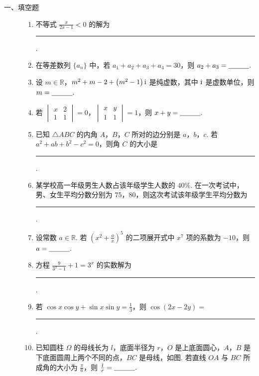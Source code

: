 \begin{description}

    \item[一、填空题]

    \begin{enumerate}[leftmargin=5pt]

        \item 不等式 \(\frac{x}{2x - 1} < 0\) 的解为\rule[-0.3ex]{3em}{0.4pt}.

        \item 在等差数列 \(\{a_n\}\) 中，若 \(a_1 + a_2 + a_3 + a_4 = 30\)，则 \(a_2 + a_3 =\rule[-0.3ex]{3em}{0.4pt}.\)

        \item 设 \(m \in \mathbb{R}\)，\(m^2 + m - 2 + \left(m^2 - 1\right)\mathrm{i}\) 是纯虚数，其中 \(\mathrm{i}\) 是虚数单位，则 \(m =\rule[-0.3ex]{3em}{0.4pt}.\)

        \item 若 \(\begin{vmatrix} x & 2 \\ 1 & 1 \end{vmatrix} = 0\)，\(\begin{vmatrix} x & y \\ 1 & 1 \end{vmatrix} = 1\)，则 \(x + y =\rule[-0.3ex]{3em}{0.4pt}.\)

        \item 已知 \(\triangle ABC\) 的内角 \(A\)，\(B\)，\(C\) 所对的边分别是 \(a\)，\(b\)，\(c\). 若 \(a^2 + ab + b^2 - c^2 = 0\)，则角 \(C\) 的大小是\rule[-0.3ex]{3em}{0.4pt}.

        \item 某学校高一年级男生人数占该年级学生人数的 \(40\%\). 在一次考试中，男、女生平均分数分别为 \(75\)，\(80\)，则这次考试该年级学生平均分数为\rule[-0.3ex]{3em}{0.4pt}.

        \item 设常数 \(a \in \mathbb{R}\). 若 \(\left(x^2 + \frac{a}{x}\right)^5\) 的二项展开式中 \(x^7\) 项的系数为 \(-10\)，则 \(a =\rule[-0.3ex]{3em}{0.4pt}.\)

        \item 方程 \(\frac{9}{3^x - 1} + 1 = 3^x\) 的实数解为\rule[-0.3ex]{3em}{0.4pt}.

        \item 若 \(\cos x\cos y+\sin x\sin y=\frac{1}{3}\)，则 \(\cos\left(2x-2y\right)=\)\rule[-0.3ex]{3em}{0.4pt}.

        \item 已知圆柱 \(\Omega\) 的母线长为 \(l\)，底面半径为 \(r\)，\(O\) 是上底面圆心，\(A\)，\(B\) 是下底面圆周上两个不同的点，\(BC\) 是母线，如图. 若直线 \(OA\) 与 \(BC\) 所成角的大小为 \(\frac{\pi}{6}\)，则 \(\frac{l}{r} =\rule[-0.3ex]{3em}{0.4pt}.\)


\end{enumerate}
\end{description}
